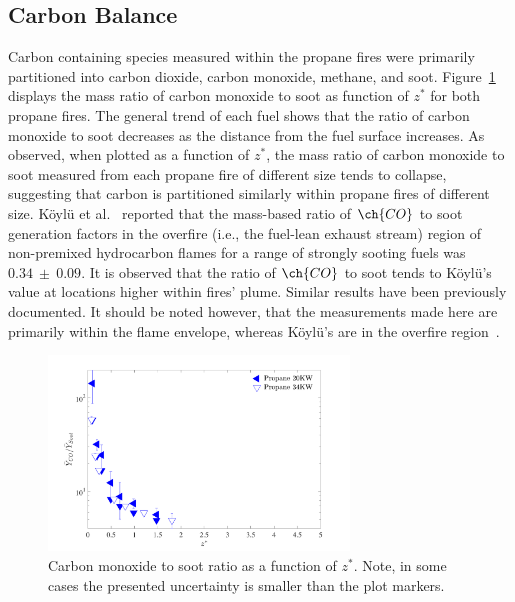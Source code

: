 \documentclass[12pt]{ussci}
\begin{document}
\subsection{Carbon Balance}
Carbon containing species measured within the propane fires were primarily partitioned into carbon dioxide, carbon monoxide, methane, and soot. Figure~\ref{fig:C2S} displays the mass ratio of carbon monoxide to soot as function of $z^*$ for both propane fires.  The general trend of each fuel shows that the ratio of carbon monoxide to soot decreases as the distance from the fuel surface increases. As observed, when plotted as a function of $z^*$, the mass ratio of carbon monoxide to soot measured from each propane fire of different size tends to collapse, suggesting that carbon is partitioned similarly within propane fires of different size. K\"{o}yl\"{u} et al.~\cite{koylu1991} reported that the mass-based ratio of $\ch{CO}$ to soot generation factors in the overfire (i.e., the fuel-lean exhaust stream) region of non-premixed hydrocarbon flames for a range of strongly sooting fuels was $0.34~\pm~0.09$. It is observed that the ratio of $\ch{CO}$ to soot tends to K\"{o}yl\"{u}'s value at locations higher within fires' plume. Similar results have been previously documented. It should be noted however, that the measurements made here are primarily within the flame envelope, whereas K\"{o}yl\"{u}'s are in the overfire region~\cite{koylu1991}.
\begin{figure}[h!]
	\centering
\includegraphics[width=8cm, keepaspectratio]{CO_Soot.pdf}
	\caption[Carbon monoxide to soot ratio as a function of mixture fraction]{Carbon monoxide to soot ratio as a function of $z^*$. Note, in some cases the presented uncertainty is smaller than the plot markers.}
	\label{fig:C2S}
\end{figure}
\end{document}
